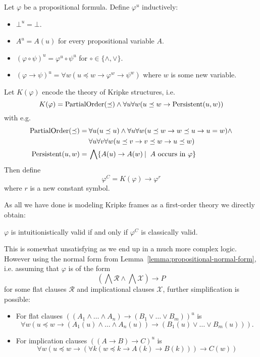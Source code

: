 \documentclass[runningheads]{llncs}
\begin{document}
\begin{definition}
	Let $\varphi$ be a propositional formula. Define $\varphi^{u}$ inductively:
	\begin{itemize}
		\item $\bot^u = \bot$.
		\item $A^{u} = A(u)$ for every propositional variable $A$.
		\item $(\varphi\circ\psi)^u = \varphi^u\circ\psi^u$ for $\circ\in\{\wedge, \vee\}$.
		\item $(\varphi\to \psi)^u = \forall w(u\preceq w\to\varphi^{w}\to\psi^{w})$ where $w$ is some new variable.
	\end{itemize}
	Let $K(\varphi)$ encode the theory of Kripke structures, i.e.
	$$K(\varphi) = \text{\normalfont PartialOrder}(\preceq)\wedge\forall u\forall w(u\preceq w\to \text{\normalfont Persistent}(u, w))$$
	with e.g.
	\begin{align*}
		\text{\normalfont PartialOrder}(\preceq) =&\:\forall u(u\preceq u)\wedge\forall u\forall w(u\preceq w\to w\preceq u\to u = w)\wedge\\&\:\forall u\forall v\forall w(u\preceq v\to v\preceq w\to u\preceq w)\\
		\text{\normalfont Persistent}(u, w)=&\:\bigwedge \{A(u)\to A(w)\:|\: \text{ $A$ occurs in $\varphi$}\}
	\end{align*}
	Then define
	$$\varphi^{C} = K(\varphi)\to \varphi^{r}$$
	where $r$ is a new constant symbol.
\end{definition}

\noindent As all we have done is modeling Kripke frames as a first-order theory we directly obtain:

\begin{lemma}
	$\varphi$ is intuitionistically valid if and only if $\varphi^C$ is classically valid.
\end{lemma}

This is somewhat unsatisfying as we end up in a much more complex logic. However using the normal form from Lemma~\ref{lemma:propositional-normal-form}, i.e. assuming that $\varphi$ is of the form $$\left(\bigwedge\mathcal R\wedge\bigwedge\mathcal X\right)\to P$$ for some flat clauses $\mathcal R$ and implicational clauses $\mathcal X$, further simplification is possible:
\begin{itemize}
	\item For flat clauses $((A_1\wedge\dots\wedge A_n)\to(B_1\vee\dots\vee B_m))^u$ is
	$$\forall w(u\preceq w\to(A_1(u)\wedge\dots\wedge A_n(u))\to(B_1(u)\vee\dots\vee B_m(u))).$$
	\item For implication clauses $((A\to B)\to C)^u$ is
	$$\forall w(u\preceq w\to(\forall k(w\preceq k\to A(k)\to B(k)))\to C(w))$$
\end{itemize}
\end{document}
